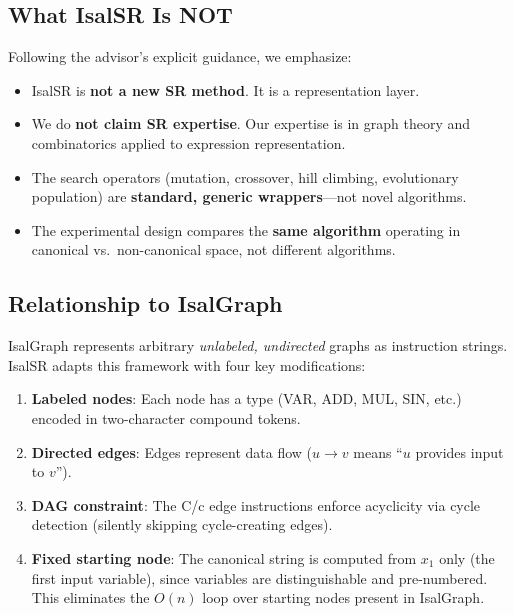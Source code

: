 \subsection{What IsalSR Is NOT}

Following the advisor's explicit guidance, we emphasize:
\begin{itemize}[nosep]
  \item IsalSR is \textbf{not a new SR method}. It is a representation layer.
  \item We do \textbf{not claim SR expertise}. Our expertise is in graph theory
    and combinatorics applied to expression representation.
  \item The search operators (mutation, crossover, hill climbing, evolutionary
    population) are \textbf{standard, generic wrappers}---not novel algorithms.
  \item The experimental design compares the \textbf{same algorithm} operating
    in canonical vs.\ non-canonical space, not different algorithms.
\end{itemize}

\subsection{Relationship to IsalGraph}

IsalGraph \cite{lopezrubio2025} represents arbitrary \emph{unlabeled, undirected}
graphs as instruction strings. IsalSR adapts this framework with four key
modifications:
\begin{enumerate}[nosep]
  \item \textbf{Labeled nodes}: Each node has a type (VAR, ADD, MUL, SIN, etc.)
    encoded in two-character compound tokens.
  \item \textbf{Directed edges}: Edges represent data flow
    ($u \to v$ means ``$u$ provides input to $v$'').
  \item \textbf{DAG constraint}: The C/c edge instructions enforce acyclicity
    via cycle detection (silently skipping cycle-creating edges).
  \item \textbf{Fixed starting node}: The canonical string is computed from
    $x_1$ only (the first input variable), since variables are distinguishable
    and pre-numbered. This eliminates the $O(n)$ loop over starting nodes
    present in IsalGraph.
\end{enumerate}
